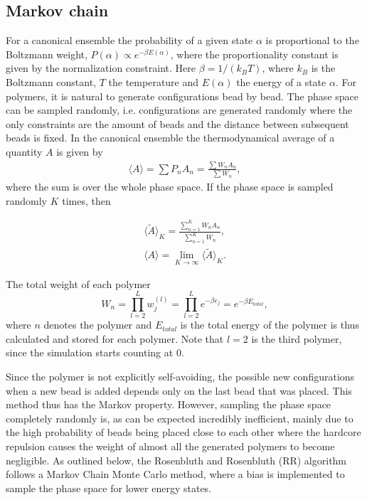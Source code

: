 \subsection{Markov chain}
For a canonical ensemble the probability of a given state $\alpha$ is proportional to the Boltzmann weight, $P(\alpha) \propto e^{-\beta E(\alpha)}$, where the proportionality constant is given by the normalization constraint.  Here $\beta=1/\left(k_B T\right)$, where $k_B$ is the Boltzmann constant, $T$ the temperature and $E(\alpha)$ the energy of a state $\alpha$. For polymers, it is natural to generate configurations bead by bead. The phase space can be sampled randomly, i.e. configurations are generated randomly where the only constraints are the amount of beads and the distance between subsequent beads is fixed.
In the canonical ensemble the thermodynamical average of a quantity $A$ is given by
\begin{gather}
	\langle A \rangle = \sum P_nA_n = \frac{\sum W_n A_n}{\sum W_n},
\end{gather}
where the sum is over the whole phase space. If the phase space is sampled randomly $K$ times, then

\begin{gather}
	\langle \tilde{A} \rangle_{K} = \frac{\sum_{n=1}^K W_n A_n}{\sum_{n=1}^K W_n},\\
	\langle A \rangle = \lim_{K\rightarrow \infty}\langle \tilde{A} \rangle_{K}.
\end{gather}


The total weight of each polymer
\begin{equation}\label{eq:polymer_weight}
    W_n = \prod_{l=2}^L w_j^{(l)} = \prod_{l=2}^Le^{-\beta e_j} = e^{-\beta E_{total}},
\end{equation} where $n$ denotes the polymer and $E_{total}$ is the total energy of the polymer is thus calculated and stored for each polymer.  Note that $l=2$ is the third polymer, since the simulation starts counting at $0$.

 Since the polymer is not explicitly self-avoiding, the possible new configurations when a new bead is added depends only on the last bead that was placed. This method thus has the Markov property. However, sampling the phase space completely randomly is, as can be expected incredibly inefficient, mainly due to the high probability of beads being placed close to each other where the hardcore repulsion causes the weight of almost all the generated polymers to become negligible. As outlined below, the Rosenbluth and Rosenbluth (RR) algorithm\cite{rosenbluth1955monte} follows a Markov Chain Monte Carlo method, where a bias is implemented to sample the phase space for lower energy states.




